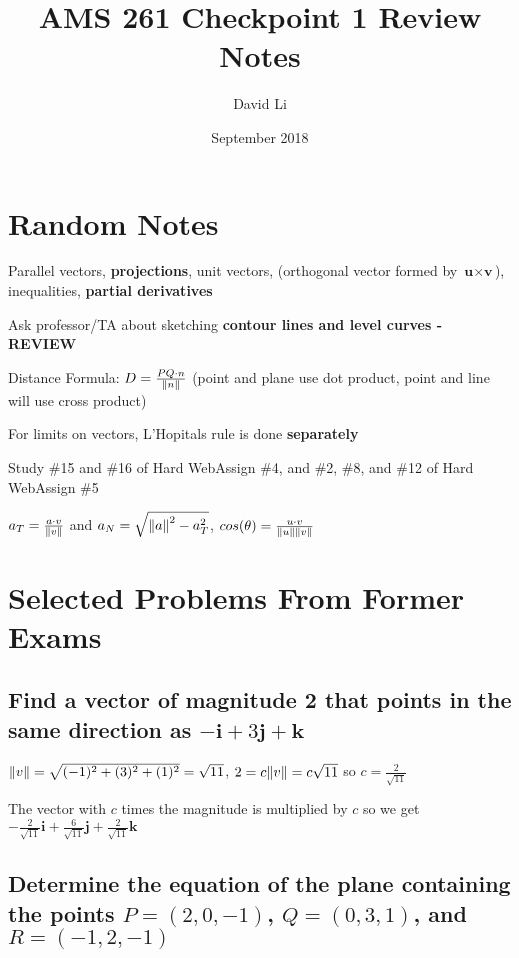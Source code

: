 \documentclass{article}
\title{AMS 261 Checkpoint 1 Review Notes}
\author{David Li}
\date{September 2018}
\begin{document}
\maketitle

\section{Random Notes}

\par\noindent\large Parallel vectors, \textbf{projections}, unit vectors, (orthogonal vector formed by $\textbf{u} \times \textbf{v}$), inequalities, \textbf{partial derivatives}

\par\noindent\large Ask professor/TA about sketching \textbf{contour lines and level curves - REVIEW}
\par\noindent\Large Distance Formula: $D = \frac{PQ \cdot n}{\norm{n}}$ (point and plane use dot product, point and line will use cross product)
\par\noindent\large For limits on vectors, L'Hopitals rule is done \textbf{separately}
\par\noindent\large Study \#15 and \#16 of Hard WebAssign \#4, and \#2, \#8, and \#12 of Hard WebAssign \#5
\par\noindent\Large $a_{T} = \frac{a \cdot v}{\norm{v}}$ and $a_{N} = \sqrt{\norm{a}^{2} - a_{T}^{2}}$, $cos(\theta) = \frac{u \cdot v}{\norm{u}\norm{v}}$
\section{Selected Problems From Former Exams}

\subsection{Find a vector of magnitude 2 that points in the same direction as $-\textbf{i} + 3\textbf{j} + \textbf{k}$}
\par\noindent\large $\norm{v} = \sqrt{(-1)^{2} + (3)^{2} + (1)^{2}} = \sqrt{11}$, $2 = c\norm{v} = c\sqrt{11}$ so $c = \frac{2}{\sqrt{11}}$
\par\noindent\large The vector with $c$ times the magnitude is multiplied by $c$ so we get $-\frac{2}{\sqrt{11}}\textbf{i} + \frac{6}{\sqrt{11}}\textbf{j} + \frac{2}{\sqrt{11}}\textbf{k}$

\subsection{Determine the equation of the plane containing the points $P = (2, 0, -1)$, $Q = (0, 3, 1)$, and $R = (-1, 2, -1)$}
\end{document}

